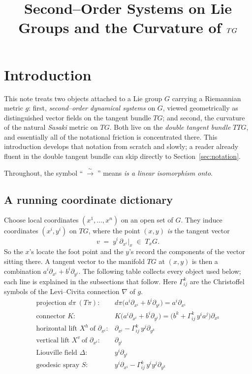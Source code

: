 \documentclass[11pt]{article}
\title{Second--Order Systems on Lie Groups and the Curvature of $\TG$}
\author{}
\date{}
\theoremstyle{definition}
\theoremstyle{plain}
\newcommand{\dpi}{d\pi}
\newcommand{\hor}[1]{#1^{h}}
\newcommand{\ver}[1]{#1^{v}}
\newcommand{\TG}{TG}
\newcommand{\TTG}{TTG}
\newcommand{\Liou}{\Delta}
\newcommand{\dd}[1]{\partial_{#1}}
\newcommand{\iso}{\;\xrightarrow{\;\sim\;}\;}
\begin{document}
\maketitle

\section{Introduction}\label{sec:intro}

This note treats two objects attached to a Lie group $G$ carrying a Riemannian metric
$g$: first, \emph{second--order dynamical systems} on $G$, viewed geometrically as
distinguished vector fields on the tangent bundle $\TG$; and second, the curvature of the
natural \emph{Sasaki} metric on $\TG$. Both live on the \emph{double tangent bundle}
$\TTG$, and essentially all of the notational friction is concentrated there. This
introduction develops that notation from scratch and slowly; a reader already fluent in
the double tangent bundle can skip directly to Section~\ref{sec:notation}.

Throughout, the symbol ``$\iso$'' means \emph{is a linear isomorphism onto}.

\subsection{A running coordinate dictionary}\label{ss:coords}

Choose local coordinates $(x^{1},\dots,x^{n})$ on an open set of $G$. They induce
coordinates $(x^{i},y^{i})$ on $\TG$, where the point $(x,y)$ \emph{is} the tangent vector
\[
  v \;=\; y^{i}\,\dd{x^{i}}\Big|_{x}\;\in\;T_{x}G .
\]
So the $x$'s locate the foot point and the $y$'s record the components of the vector
sitting there. A tangent vector to the manifold $\TG$ at $(x,y)$ is then a combination
$a^{i}\dd{x^{i}}+b^{i}\dd{y^{i}}$. The following table collects every object used below;
each line is explained in the subsections that follow. Here $\Gamma^{k}_{ij}$ are the
Christoffel symbols of the Levi--Civita connection $\nabla$ of $g$.
\[
\renewcommand{\arraystretch}{1.35}
\begin{array}{ll}
\text{projection } \dpi \ (T\pi): & \dpi\bigl(a^{i}\dd{x^{i}}+b^{i}\dd{y^{i}}\bigr)=a^{i}\dd{x^{i}}\\
\text{connector } K: & K\bigl(a^{i}\dd{x^{i}}+b^{i}\dd{y^{i}}\bigr)=\bigl(b^{k}+\Gamma^{k}_{ij}\,y^{i}a^{j}\bigr)\dd{x^{k}}\\
\text{horizontal lift } \hor{X}\ \text{of }\dd{x^{i}}: & \dd{x^{i}}-\Gamma^{k}_{ij}\,y^{j}\dd{y^{k}}\\
\text{vertical lift } \ver{X}\ \text{of }\dd{x^{i}}: & \dd{y^{i}}\\
\text{Liouville field } \Liou: & y^{i}\dd{y^{i}}\\
\text{geodesic spray } S: & y^{i}\dd{x^{i}}-\Gamma^{k}_{ij}\,y^{i}y^{j}\dd{y^{k}}
\end{array}
\]
\end{document}

